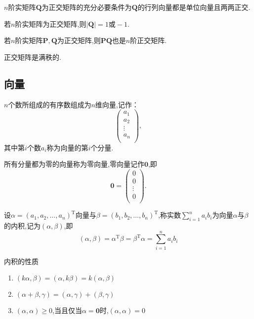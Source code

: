 \begin{ttheorem}
    $n$阶实矩阵$\mathbf{Q}$为正交矩阵的充分必要条件为$\mathbf{Q}$的行列向量都是单位向量且两两正交.
\end{ttheorem}

若$n$阶实矩阵为正交矩阵,则$\left\lvert \mathbf{Q}\right\rvert =1 \text{或}-1$.

若$n$阶实矩阵$\mathbf{P},\mathbf{Q}$为正交矩阵,则$\mathbf{P}\mathbf{Q}$也是$n$阶正交矩阵.

正交矩阵是满秩的.

\subsection{向量}
\begin{definition}
    $n$个数所组成的有序数组成为$n$维向量,记作：
    \begin{equation*}
    \begin{pmatrix}
    a_1   \\
    a_2   \\
    \vdots   \\
    a_n   \\
    \end{pmatrix},
    \end{equation*}
    其中第$i$个数$a_i$称为向量的第$i$个分量.
\end{definition}
\begin{definition}
    所有分量都为零的向量称为零向量,零向量记作$\mathbf{0}$,即
    \begin{equation*}
    \mathbf{0}=\begin{pmatrix}
    0   \\
    0   \\
    \vdots   \\
    0   \\
    \end{pmatrix}.
    \end{equation*}
\end{definition}
\begin{definition}
    设$\alpha=(a_1,a_2,\dots,a_n)^\mathrm{T}$向量与$\beta=(b_1,b_2,\dots,b_n)^\mathrm{T}$,称实数$\sum_{i=1}^{n} a_ib_i$为向量$\alpha$与$\beta$的内积,记为$(\alpha,\beta)$,即
    \begin{equation*}
        (\alpha,\beta)=\alpha^\mathrm{T}\beta=\beta^\mathrm{T}\alpha=\sum_{i=1}^{n} a_ib_i
    \end{equation*}
\end{definition}
内积的性质
\begin{enumerate}
    \item $(k\alpha,\beta)=(\alpha,k\beta)=k(\alpha,\beta)$
    \item $(\alpha+\beta,\gamma)=(\alpha,\gamma)+(\beta,\gamma)$
    \item $(\alpha,\alpha)\geqslant 0$,当且仅当$\alpha=\mathbf{0}$时,$(\alpha,\alpha)=0$
\end{enumerate}

